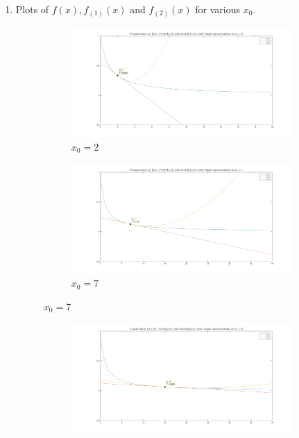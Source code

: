 \documentclass[12pt]{article}
\begin{document}
\begin{enumerate}
\begin{enumerate}
\item 
Plots of $f(x),f_{(1)}(x)$ and $f_{(2)}(x)$ for various $x_0$.
\begin{figure}
	\centering
	\begin{subfigure}[b]{\textwidth}
		\centering
		\includegraphics[width=\textwidth]{1.png}
		\caption{$x_0=2$}
		\label{fig:1}
	\end{subfigure}
	\begin{subfigure}[b]{\textwidth}
		\centering
		\includegraphics[width=\textwidth]{2.png}
		\caption{$x_0=7$}
		\label{fig:2}
	\end{subfigure}
\end{figure}
\begin{figure}
	\centering
	\begin{subfigure}[b]{\textwidth}
		\centering
		\includegraphics[width=\textwidth]{3.png}

\end{subfigure}
\end{figure}
\end{enumerate}
\end{enumerate}
\end{document}
